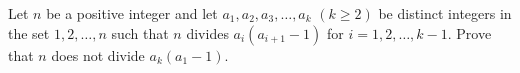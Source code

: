 Let $ n$ be a positive integer and let $ a_1,a_2,a_3,\ldots,a_k$ $ ( k\ge 2)$ be distinct integers in the set $ { 1,2,\ldots,n}$ such that $ n$ divides $ a_i(a_{i + 1} - 1)$ for $ i = 1,2,\ldots,k - 1$. Prove that $ n$ does not divide $ a_k(a_1 - 1).$